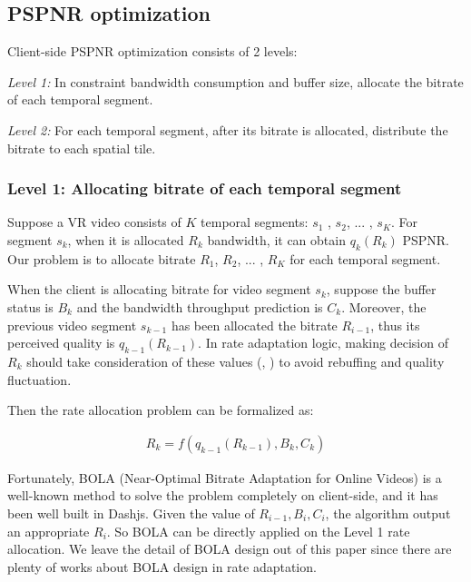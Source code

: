 \subsection{PSPNR optimization}

Client-side PSPNR optimization consists of 2 levels:

\emph{Level 1:} In constraint bandwidth consumption and buffer size, allocate the bitrate of each temporal segment.

\emph{Level 2:} For each temporal segment, after its bitrate is allocated, distribute the bitrate to each spatial tile.

\subsubsection{Level 1: Allocating bitrate of each temporal segment}

Suppose a VR video consists of $K$ temporal segments: $s_1$ , $s_2$, ... , $s_K$. For segment $s_k$, when it is allocated $R_k$ bandwidth, it can obtain $q_{k}(R_k)$ PSPNR. Our problem is to allocate bitrate $R_1$, $R_2$, ... , $R_K$ for each temporal segment.

When the client is allocating bitrate for video segment $s_k$, suppose the buffer status is $B_k$ and the bandwidth throughput prediction is $C_k$. Moreover, the previous video segment $s_{k-1}$ has been allocated the bitrate $R_{i-1}$, thus its perceived quality is $q_{k-1}(R_{k-1})$. In rate adaptation logic, making decision of $R_k$ should take consideration of these values (\cite{BOLA}, \cite{MPC}) to avoid rebuffing and quality fluctuation.

Then the rate allocation problem can be formalized as:

\begin{equation}
\begin{aligned}
R_k = f(q_{k-1}(R_{k-1}), B_k, C_k)
\end{aligned}
\end{equation}

Fortunately, BOLA (Near-Optimal Bitrate Adaptation for Online Videos) \cite{BOLA} is a well-known method to solve the problem completely on client-side, and it has been well built in Dashjs. Given the value of $R_{i-1}, B_i, C_i$, the algorithm output an appropriate $R_i$. So BOLA can be directly applied on the Level 1 rate allocation. We leave the detail of BOLA design out of this paper since there are plenty of works about BOLA design in rate adaptation.

